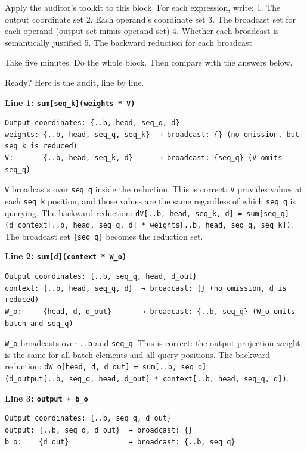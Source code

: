 \documentclass[11pt,titlepage]{article}
\begin{document}
Apply the auditor's toolkit to this block. For each expression, write:
1. The output coordinate set 2. Each operand's coordinate set 3. The
broadcast set for each operand (output set minus operand set) 4. Whether
each broadcast is semantically justified 5. The backward reduction for
each broadcast

Take five minutes. Do the whole block. Then compare with the answers
below.

\vspace{2em}

Ready? Here is the audit, line by line.

\textbf{Line 1: \texttt{sum{[}seq\_k{]}(weights\ *\ V)}}

\begin{verbatim}
Output coordinates: {..b, head, seq_q, d}
weights: {..b, head, seq_q, seq_k}  → broadcast: {} (no omission, but seq_k is reduced)
V:       {..b, head, seq_k, d}      → broadcast: {seq_q} (V omits seq_q)
\end{verbatim}

\texttt{V} broadcasts over \texttt{seq\_q} inside the reduction. This is
correct: \texttt{V} provides values at each \texttt{seq\_k} position,
and those values are the same regardless of which \texttt{seq\_q} is
querying. The backward reduction:
\texttt{dV{[}..b,\ head,\ seq\_k,\ d{]}\ =\ sum{[}seq\_q{]}(d\_context{[}..b,\ head,\ seq\_q,\ d{]}\ *\ weights{[}..b,\ head,\ seq\_q,\ seq\_k{]})}.
The broadcast set \texttt{\{seq\_q\}} becomes the reduction set.

\textbf{Line 2: \texttt{sum{[}d{]}(context\ *\ W\_o)}}

\begin{verbatim}
Output coordinates: {..b, seq_q, head, d_out}
context: {..b, head, seq_q, d}  → broadcast: {} (no omission, d is reduced)
W_o:     {head, d, d_out}       → broadcast: {..b, seq_q} (W_o omits batch and seq_q)
\end{verbatim}

\texttt{W\_o} broadcasts over \texttt{..b} and \texttt{seq\_q}. This is
correct: the output projection weight is the same for all batch elements
and all query positions. The backward reduction:
\texttt{dW\_o{[}head,\ d,\ d\_out{]}\ =\ sum{[}..b,\ seq\_q{]}(d\_output{[}..b,\ seq\_q,\ head,\ d\_out{]}\ *\ context{[}..b,\ head,\ seq\_q,\ d{]})}.

\textbf{Line 3: \texttt{output\ +\ b\_o}}

\begin{verbatim}
Output coordinates: {..b, seq_q, d_out}
output: {..b, seq_q, d_out}  → broadcast: {}
b_o:    {d_out}              → broadcast: {..b, seq_q}
\end{verbatim}
\end{document}
